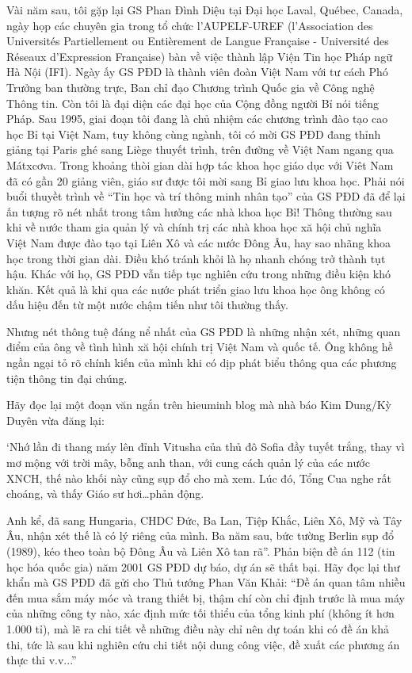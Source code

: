 Vài năm sau, tôi gặp lại GS Phan Đình Diệu tại Đại học Laval, Québec, Canada, ngày họp các chuyên gia trong tổ chức l’AUPELF-UREF (l’Association des Universités Partiellement ou Entièrement de Langue Française - Université des Réseaux d’Expression Française) bàn về việc thành lập Viện Tin học Pháp ngữ Hà Nội (IFI). Ngày ấy GS PĐD là thành viên đoàn Việt Nam với tư cách Phó Trưởng ban thường trực, Ban chỉ đạo Chương trình Quốc gia về Công nghệ Thông tin. Còn tôi là đại diện các đại học của Cộng đồng người Bỉ nói tiếng Pháp.
Sau 1995, giai đoạn tôi đang là chủ nhiệm các chương trình đào tạo cao học Bỉ tại Việt Nam, tuy không cùng ngành, tôi có mời GS PĐD đang thỉnh giảng tại Paris ghé sang Liège thuyết trình, trên đường về Việt Nam ngang qua Mátxcơva. Trong khoảng thòi gian dài hợp tác khoa học giáo dục với Viêt Nam đã có gần 20 giảng viên, giáo sư được tôi mời sang Bỉ giao lưu khoa học. Phải nói buổi thuyềt trình về “Tin học và trí thông minh nhân tạo” của GS PĐD  đã để lại ấn tượng rõ nét nhất trong tâm hưởng các nhà khoa học Bỉ!
Thông thường sau khi về nước tham gia quản lý và chính trị các nhà khoa học xă hội chủ nghĩa Việt Nam được đào tạo tại Liên Xô và các nước Đông Âu, hay sao nhãng khoa học trong thời gian dài. Điều khó tránh khỏi là họ nhanh chóng trở thành tụt hậu. Khác với họ, GS PĐD vẫn tiếp tục nghiên cứu trong những điều kiện khó khăn. Kết quả là khi qua các nước phát triển giao lưu khoa học ông không có dấu hiệu đến từ một nước chậm tiến như tôi thường thấy.

Nhưng nét thông tuệ đáng nể nhất của GS PĐD là những nhận xét, những quan điểm của ông về tình hình xă hội chính trị Việt Nam và quốc tế. Ông không hề ngần ngại tỏ rõ chính kiến của mình khi có dịp phát biểu thông qua các phương tiện thông tin đại chúng. 

Hãy đọc lại một đoạn văn ngắn trên hieuminh blog mà nhà báo Kim Dung/Kỳ Duyên vừa đăng lại:

‘Nhớ lần đi thang máy lên đỉnh Vitusha của thủ đô Sofia đầy tuyết trắng, thay vì mơ mộng với trời mây, bỗng anh than, với cung cách quản lý của các nước XNCH, thế nào khối này cũng sụp đổ cho mà xem. Lúc đó, Tổng Cua nghe rất choáng, và thấy Giáo sư hơi…phản động.

Anh kể, đã sang Hungaria, CHDC Đức, Ba Lan, Tiệp Khắc, Liên Xô, Mỹ và Tây Âu, nhận xét thế là có lý riêng của mình. Ba năm sau, bức tường Berlin sụp đổ (1989), kéo theo toàn bộ Đông Âu và Liên Xô tan rã”.
Phản biện đề án 112 (tin học hóa quốc gia) năm 2001 GS PĐD dự báo, dự án sẽ thất bại. Hãy đọc lại thư khẩn mà GS PĐD đã gửi cho Thủ tướng Phan Văn Khải:
“Đề án quan tâm nhiều đến mua sắm máy móc và trang thiết bị, thậm chí còn chỉ định trước là mua máy của những công ty nào, xác định mức tối thiểu của tổng kinh phí (không ít hơn 1.000 tỉ), mà lẽ ra chi tiết về những điều này chỉ nên dự toán khi có đề án khả thi, tức là sau khi nghiên cứu chi tiết nội dung công việc, đề xuất các phương án thực thi v.v...”

